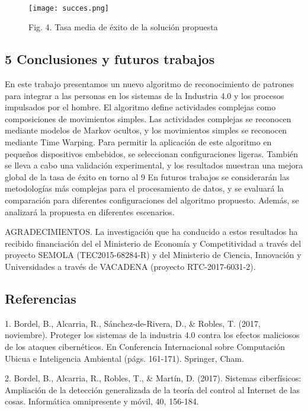 \documentclass{paper}
\begin{document}
\ \begin{figure}[H]
    \centering
    \texttt{[image: succes.png]}
    \caption{Fig. 4. Tasa media de éxito de la solución propuesta}
    \label{fig:my_label}
\end{figure}



\subsection*{ 5  Conclusiones y futuros trabajos}

En este trabajo presentamos un nuevo algoritmo de reconocimiento de patrones para integrar a las personas en los sistemas de la Industria 4.0 y los procesos impulsados por el hombre. El algoritmo define actividades complejas
como composiciones de movimientos simples. Las actividades complejas se reconocen mediante modelos de Markov ocultos, y los movimientos simples se reconocen mediante Time Warping. Para permitir la aplicación de este algoritmo en pequeños dispositivos embebidos, se seleccionan configuraciones ligeras. También se lleva a cabo una validación experimental, y los resultados muestran una mejora global de la tasa de éxito en torno al 9%
En futuros trabajos se considerarán las metodologías más complejas para el procesamiento de datos, y se evaluará la comparación para diferentes configuraciones del algoritmo propuesto. Además, se analizará la propuesta en diferentes escenarios.

AGRADECIMIENTOS. La investigación que ha conducido a estos resultados ha recibido financiación del el Ministerio de Economía y Competitividad a través del proyecto SEMOLA (TEC2015-68284-R) y del Ministerio de Ciencia, Innovación y Universidades a través de VACADENA (proyecto RTC-2017-6031-2).


\subsection*{Referencias}

\bigskip
\bigskip

1. Bordel, B., Alcarria, R., Sánchez-de-Rivera, D., & Robles, T. (2017, noviembre). Proteger los sistemas de la industria 4.0 contra los efectos maliciosos de los ataques cibernéticos. En
Conferencia Internacional sobre Computación Ubicua e Inteligencia Ambiental (págs. 161-171). Springer, Cham.

\bigskip
\bigskip

 2. Bordel, B., Alcarria, R., Robles, T., & Martín, D. (2017). Sistemas ciberfísicos:
Ampliación de la detección generalizada de la teoría del control al Internet de las cosas. Informática omnipresente y móvil, 40, 156-184.
\end{document}
